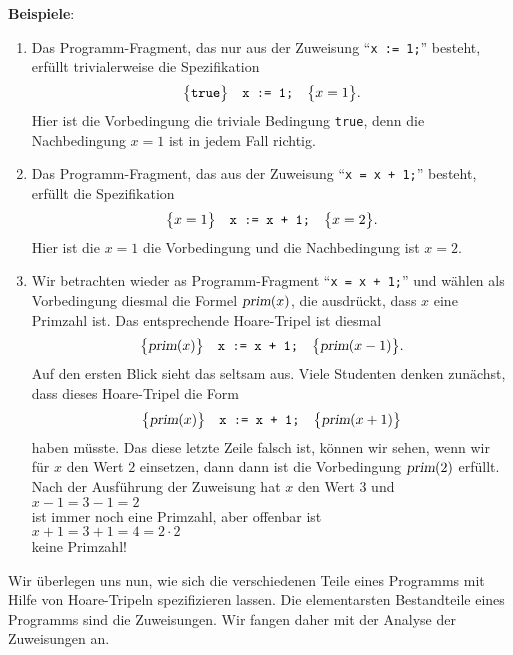 \noindent
\textbf{Beispiele}:
\begin{enumerate}
\item Das Programm-Fragment, das nur aus der Zuweisung  ``\texttt{x := 1;}'' besteht,
      erf\"ullt trivialerweise die Spezifikation
      \[ \bigl\{\mathtt{true}\bigr\}\quad\texttt{x := 1;}\quad\bigl\{x = 1\bigr\}. \]
      Hier ist die Vorbedingung die triviale Bedingung \texttt{true}, denn
      die Nachbedingung $x = 1$ ist in jedem Fall richtig.
\item Das Programm-Fragment, das aus der Zuweisung  ``\texttt{x = x + 1;}'' besteht,
      erf\"ullt die Spezifikation
      \[ \bigl\{x=1\bigr\}\quad\texttt{x := x + 1;}\quad\bigl\{x=2\bigr\}. \]
      Hier ist die $x = 1$ die Vorbedingung und die Nachbedingung ist $x = 2$.
\item Wir betrachten wieder as Programm-Fragment  ``\texttt{x = x + 1;}'' und w\"ahlen als
      Vorbedingung diesmal die Formel $\textsl{prim}(x)$, die ausdr\"uckt, dass $x$ eine
      Primzahl ist.  Das entsprechende Hoare-Tripel ist diesmal
      \[ \bigl\{\textsl{prim}(x)\bigr\}\quad\texttt{x := x + 1;}\quad\bigl\{\textsl{prim}(x-1)\bigr\}. \]
      Auf den ersten Blick sieht das seltsam aus.  Viele Studenten denken zun\"achst, dass
      dieses Hoare-Tripel die Form
      \[ \bigl\{\textsl{prim}(x)\bigr\}\quad\texttt{x := x + 1;}\quad\bigl\{\textsl{prim}(x+1)\bigr\} \] 
      haben m\"usste.  Das diese letzte Zeile falsch ist, k\"onnen wir sehen, wenn wir f\"ur $x$
      den Wert $2$ einsetzen, dann dann ist die Vorbedingung $\textsl{prim}(2)$ erf\"ullt.
      Nach der Ausf\"uhrung der Zuweisung hat $x$ den Wert $3$ und
      \\[0.2cm]
      \hspace*{1.3cm}
      $x - 1 = 3 - 1 = 2$
      \\[0.2cm]
      ist immer
      noch eine Primzahl, aber offenbar ist
      \\[0.2cm]
      \hspace*{1.3cm}
      $x + 1 = 3 + 1 = 4 = 2 \cdot 2$ 
      \\[0.2cm]
      keine Primzahl!
\end{enumerate}
Wir \"uberlegen uns nun, wie sich die verschiedenen Teile eines Programms mit Hilfe von
Hoare-Tripeln spezifizieren lassen.  Die elementarsten Bestandteile eines Programms sind
die Zuweisungen.  Wir fangen daher mit der Analyse der Zuweisungen an.
 
